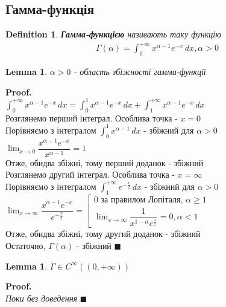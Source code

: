 \documentclass[a4paper, 14pt]{extarticle}
\def\huge{\displaystyle}
\theoremstyle{theoremdd}
\theoremstyle{theoremdd}
\newtheorem{definition}[theorem]{Definition}
\theoremstyle{theoremdd}
\theoremstyle{theoremdd}
\theoremstyle{theoremdd}
\theoremstyle{theoremdd}
\newtheorem{lemma}[theorem]{Lemma}
\theoremstyle{theoremdd}
\newenvironment{pf}{\vspace*{-3mm} \textbf{Proof. \\}}{$\blacksquare$}
\begin{document}
\subsection{Гамма-функція}
\begin{definition}
\textbf{Гамма-функцією} називають таку функцію
\begin{align*}
\Gamma(\alpha) = \huge \int_0^{+\infty} x^{\alpha-1}e^{-x}\,dx, \alpha > 0
\end{align*}
\end{definition}

\begin{lemma}
$\alpha > 0$ - область збіжності гамми-функції
\end{lemma}

\begin{pf}
$\huge \int_0^{+\infty} x^{\alpha-1}e^{-x}\,dx = \int_0^1 x^{\alpha-1}e^{-x}\,dx + \int_1^{+\infty} x^{\alpha-1}e^{-x}\,dx$\\
Розглянемо перший інтеграл. Особлива точка - $x = 0$\\
Порівняємо з інтегралом $\huge \int_0^1 x^{\alpha-1}\,dx$ - збіжний для $\alpha > 0$\\
$\huge \lim_{x \to 0} \dfrac{x^{\alpha-1} e^{-x}}{x^{\alpha -1}} = 1$\\
Отже, обидва збіжні, тому перший доданок - збіжний\\
Розглянемо другий інтеграл. Особлива точка - $x = \infty$\\
Порівняємо з інтегралом $\huge \int_1^{+\infty} e^{-\frac{x}{2}} \,dx$ - збіжний для $\alpha > 0$\\
$\huge \lim_{x \to \infty} \dfrac{x^{\alpha -1} e^{-x}}{e^{-\frac{x}{2}}} = \left[ \begin{gathered} 0 \textrm{ за правилом Лопіталя, } \alpha \geq 1 \\ \huge \lim_{x \to \infty} \dfrac{1}{x^{1-\alpha} e^{\frac{x}{2}}} = 0, \alpha < 1 \end{gathered} \right.$\\
Отже, обидва збіжні, тому другий доданок - збіжний\\
Остаточно, $\Gamma(\alpha)$ - збіжний
\end{pf}

\begin{lemma}
$\Gamma \in C^{\infty} ((0,+\infty))$
\end{lemma}

\begin{pf}
\textit{Поки без доведення}
\end{pf}
\end{document}
